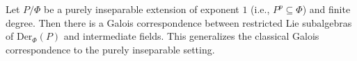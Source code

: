 Let $P/\Phi$ be a purely inseparable extension of exponent $1$ (i.e., $P^p \subseteq \Phi$) and finite degree. Then there is a Galois correspondence between restricted Lie subalgebras of $\text{Der}_\Phi(P)$ and intermediate fields. This generalizes the classical Galois correspondence to the purely inseparable setting.
